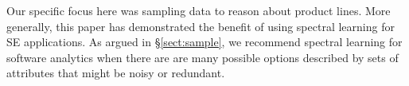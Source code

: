 \documentclass{sig-alternative}
\newcommand{\tion}[1]{\S\ref{sect:#1}}
\begin{document}
Our specific focus here was sampling data
to reason about product lines. More generally,
this paper has demonstrated the benefit of using
spectral learning for SE applications.  As argued in \tion{sample},
we recommend spectral learning  for software analytics when there are
are many possible options described by sets of attributes
that might be noisy or redundant.  



\vspace*{0.5mm}
 
 


\balance
  
\end{document}
